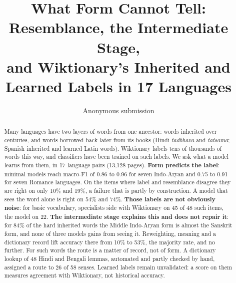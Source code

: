 \documentclass[11pt]{article}
\title{What Form Cannot Tell: Resemblance, the Intermediate Stage,\\and Wiktionary's Inherited and Learned Labels in 17 Languages}
\author{Anonymous submission}
\begin{document}
\maketitle

\begin{abstract}
Many languages have two layers of words from one ancestor: words inherited over centuries, and words borrowed back later from its books (Hindi \textit{tadbhava} and \textit{tatsama}; Spanish inherited and learned Latin words). Wiktionary labels tens of thousands of words this way, and classifiers have been trained on such labels. We ask what a model learns from them, in 17 language pairs (13,128 pages). \textbf{Form predicts the label}: minimal models reach macro-F1 of 0.86 to 0.96 for seven Indo-Aryan and 0.75 to 0.91 for seven Romance languages. On the items where label and resemblance disagree they are right on only 10\% and 19\%, a failure that is partly by construction. A model that sees the word alone is right on 54\% and 74\%. \textbf{Those labels are not obviously noise}: for basic vocabulary, specialists side with Wiktionary on 45 of 48 such items, the model on 22. \textbf{The intermediate stage explains this and does not repair it}: for 84\% of the hard inherited words the Middle Indo-Aryan form is almost the Sanskrit form, and none of three models gains from seeing it. Reweighting, meaning and a dictionary record lift accuracy there from 10\% to 53\%, the majority rate, and no further. For such words the route is a matter of record, not of form. A dictionary lookup of 48 Hindi and Bengali lemmas, automated and partly checked by hand, assigned a route to 26 of 58 senses. Learned labels remain unvalidated: a score on them measures agreement with Wiktionary, not historical accuracy.
\end{abstract}
\end{document}
